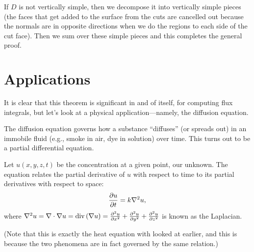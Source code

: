 If $D$ is not vertically simple, then we decompose it into vertically simple pieces (the faces that get added to the surface from the cuts are cancelled out because the normals are in opposite directions when we do the regions to each side of the cut face). Then we sum over these simple pieces and this completes the general proof.
\epf

\section{Applications}
It is clear that this theorem is significant in and of itself, for computing flux integrals, but let's look at a physical application---namely, the diffusion equation.

The diffusion equation governs how a substance ``diffuses'' (or spreads out) in an immobile fluid (e.g., smoke in air, dye in solution) over time. This turns out to be a partial differential equation.

Let $u(x,y,z,t)$ be the concentration at a given point, our unknown. The equation relates the partial derivative of $u$ with respect to time to its partial derivatives with respect to space:
\[ \frac{\partial u}{\partial t} = k\nabla^2u ,\]
where $\nabla^2 u = \nabla \cdot \nabla u = \mathrm{div}\,(\nabla u) = \frac{\partial^{2}u}{\partial x^{2}} + \frac{\partial^{2}u}{\partial y^{2}} + \frac{\partial^{2}u}{\partial z^{2}}$ is known as the Laplacian.

(Note that this is exactly the heat equation with looked at earlier, and this is because the two phenomena are in fact governed by the same relation.)


